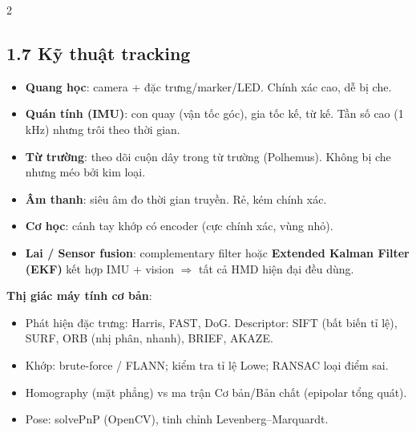 \begin{paracol}{2}
\subsection*{1.7 Kỹ thuật tracking}
\begin{itemize}[leftmargin=*,nosep]
  \item \textbf{Quang học}: camera + đặc trưng/marker/LED. Chính xác cao, dễ bị che.
  \item \textbf{Quán tính (IMU)}: con quay (vận tốc góc), gia tốc kế, từ kế. Tần số cao (1 kHz) nhưng trôi theo thời gian.
  \item \textbf{Từ trường}: theo dõi cuộn dây trong từ trường (Polhemus). Không bị che nhưng méo bởi kim loại.
  \item \textbf{Âm thanh}: siêu âm đo thời gian truyền. Rẻ, kém chính xác.
  \item \textbf{Cơ học}: cánh tay khớp có encoder (cực chính xác, vùng nhỏ).
  \item \textbf{Lai / Sensor fusion}: complementary filter hoặc \textbf{Extended Kalman Filter (EKF)} kết hợp IMU + vision $\Rightarrow$ tất cả HMD hiện đại đều dùng.
\end{itemize}
\textbf{Thị giác máy tính cơ bản}:
\begin{itemize}[leftmargin=*,nosep]
  \item Phát hiện đặc trưng: Harris, FAST, DoG. Descriptor: SIFT (bất biến tỉ lệ), SURF, ORB (nhị phân, nhanh), BRIEF, AKAZE.
  \item Khớp: brute-force / FLANN; kiểm tra tỉ lệ Lowe; RANSAC loại điểm sai.
  \item Homography (mặt phẳng) vs ma trận Cơ bản/Bản chất (epipolar tổng quát).
  \item Pose: solvePnP (OpenCV), tinh chỉnh Levenberg–Marquardt.
\end{itemize}

\switchcolumn*


\end{paracol}
